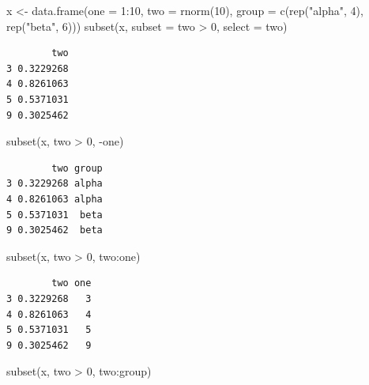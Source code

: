 \documentclass[
]{book}
\newenvironment{Shaded}{\begin{snugshade}}{\end{snugshade}}
\newcommand{\AttributeTok}[1]{\textcolor[rgb]{0.77,0.63,0.00}{#1}}
\newcommand{\DecValTok}[1]{\textcolor[rgb]{0.00,0.00,0.81}{#1}}
\newcommand{\FunctionTok}[1]{\textcolor[rgb]{0.00,0.00,0.00}{#1}}
\newcommand{\NormalTok}[1]{#1}
\newcommand{\OtherTok}[1]{\textcolor[rgb]{0.56,0.35,0.01}{#1}}
\newcommand{\SpecialCharTok}[1]{\textcolor[rgb]{0.00,0.00,0.00}{#1}}
\newcommand{\StringTok}[1]{\textcolor[rgb]{0.31,0.60,0.02}{#1}}
\begin{document}
\begin{Shaded}
\begin{Highlighting}[]
\NormalTok{x }\OtherTok{\textless{}{-}} \FunctionTok{data.frame}\NormalTok{(}\AttributeTok{one =} \DecValTok{1}\SpecialCharTok{:}\DecValTok{10}\NormalTok{,}
                \AttributeTok{two =} \FunctionTok{rnorm}\NormalTok{(}\DecValTok{10}\NormalTok{),}
                \AttributeTok{group =} \FunctionTok{c}\NormalTok{(}\FunctionTok{rep}\NormalTok{(}\StringTok{"alpha"}\NormalTok{, }\DecValTok{4}\NormalTok{),  }\FunctionTok{rep}\NormalTok{(}\StringTok{"beta"}\NormalTok{, }\DecValTok{6}\NormalTok{)))}
\FunctionTok{subset}\NormalTok{(x, }\AttributeTok{subset =}\NormalTok{ two }\SpecialCharTok{\textgreater{}} \DecValTok{0}\NormalTok{, }\AttributeTok{select =}\NormalTok{ two)}
\end{Highlighting}
\end{Shaded}

\begin{verbatim}
        two
3 0.3229268
4 0.8261063
5 0.5371031
9 0.3025462
\end{verbatim}

\begin{Shaded}
\begin{Highlighting}[]
\FunctionTok{subset}\NormalTok{(x, two }\SpecialCharTok{\textgreater{}} \DecValTok{0}\NormalTok{, }\SpecialCharTok{{-}}\NormalTok{one)}
\end{Highlighting}
\end{Shaded}

\begin{verbatim}
        two group
3 0.3229268 alpha
4 0.8261063 alpha
5 0.5371031  beta
9 0.3025462  beta
\end{verbatim}

\begin{Shaded}
\begin{Highlighting}[]
\FunctionTok{subset}\NormalTok{(x, two }\SpecialCharTok{\textgreater{}} \DecValTok{0}\NormalTok{, two}\SpecialCharTok{:}\NormalTok{one)}
\end{Highlighting}
\end{Shaded}

\begin{verbatim}
        two one
3 0.3229268   3
4 0.8261063   4
5 0.5371031   5
9 0.3025462   9
\end{verbatim}

\begin{Shaded}
\begin{Highlighting}[]
\FunctionTok{subset}\NormalTok{(x, two }\SpecialCharTok{\textgreater{}} \DecValTok{0}\NormalTok{, two}\SpecialCharTok{:}\NormalTok{group)}
\end{Highlighting}
\end{Shaded}
\end{document}
